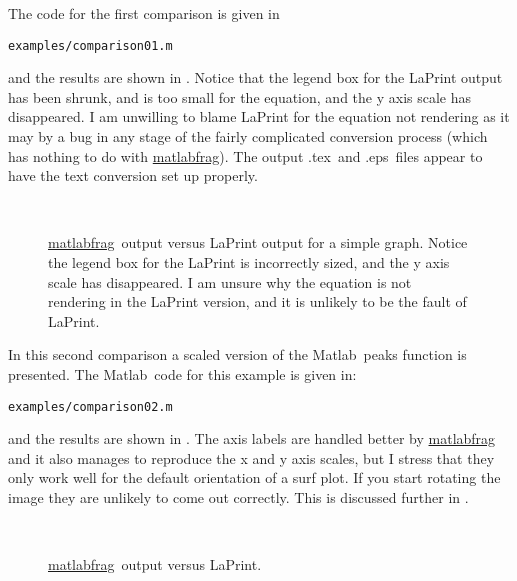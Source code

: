 \documentclass[a4paper,11pt]{article}
\newcommand\matlabfrag{\texorpdfstring{\href{http://www.mathworks.com/matlabcentral/fileexchange/21286}{{\ttfamily matlabfrag}}}{matlabfrag}}
\newcommand\matlab{\texorpdfstring{{\sc Matlab}}{Matlab}}
\newcommand\tex{\texorpdfstring{{\sc .tex}}{.tex}}
\newcommand\eps{\texorpdfstring{{\sc .eps}}{.eps}}
\begin{document}
    The code for the first comparison is given in\par
    {\verb|examples/comparison01.m|}\par\noindent
    and the results are shown in . Notice that the legend box for the LaPrint
    output has been shrunk, and is too small for the equation, and the y axis scale has disappeared.
    I am unwilling to blame {\ttfamily LaPrint} for the equation not rendering as it may by a bug
    in any stage of the fairly complicated conversion process (which has nothing to do with
    \matlabfrag). The output \tex\ and \eps\ files appear to have the text conversion set up
    properly.
    \begin{figure}[ht]
      \centering
      \,
      \caption{\matlabfrag\ output versus {\ttfamily LaPrint} output for a simple graph. Notice the
        legend box for the {\ttfamily LaPrint} is incorrectly sized, and the y axis scale has
        disappeared. I am unsure why the equation is not rendering in the {\ttfamily LaPrint}
        version, and it is unlikely to be the fault of {\ttfamily LaPrint}.}
    \end{figure}
    
    In this second comparison a scaled version of the \matlab\ {\ttfamily peaks} function is
    presented. The \matlab\ code for this example is given in:\par
    {\verb|examples/comparison02.m|}\par\noindent
    and the results are shown in . The axis labels are handled better by
    \matlabfrag\, and it also manages to reproduce the x and y axis scales, but I stress that they
    only work well for the default orientation of a {\ttfamily surf} plot. If you start rotating
    the image they are unlikely to come out correctly. This is discussed further in .
    \begin{figure}[ht]
      \centering
      \,
      \caption{\matlabfrag\ output versus {\ttfamily LaPrint}.}
    \end{figure}
    
\end{document}

